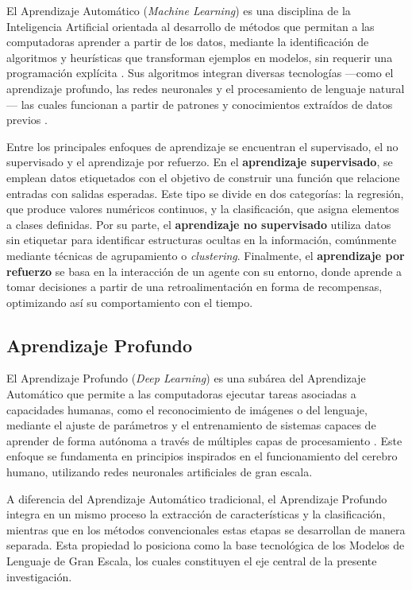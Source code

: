 \documentclass[listof=nochaptergap,12pt,times,authoryear]{report}
\begin{document}
El Aprendizaje Automático (\textit{Machine Learning}) es una disciplina de la Inteligencia Artificial orientada al desarrollo de métodos que permitan a las computadoras aprender a partir de los datos, mediante la identificación de algoritmos y heurísticas que transforman ejemplos en modelos, sin requerir una programación explícita \parencite{bk_russell2009intart}. Sus algoritmos integran diversas tecnologías —como el aprendizaje profundo, las redes neuronales y el procesamiento de lenguaje natural— las cuales funcionan a partir de patrones y conocimientos extraídos de datos previos \parencite{bk_alpaydin2014ml}.

Entre los principales enfoques de aprendizaje se encuentran el supervisado, el no supervisado y el aprendizaje por refuerzo. En el \textbf{aprendizaje supervisado}, se emplean datos etiquetados con el objetivo de construir una función que relacione entradas con salidas esperadas. Este tipo se divide en dos categorías: la regresión, que produce valores numéricos continuos, y la clasificación, que asigna elementos a clases definidas. Por su parte, el \textbf{aprendizaje no supervisado} utiliza datos sin etiquetar para identificar estructuras ocultas en la información, comúnmente mediante técnicas de agrupamiento o \textit{clustering}. Finalmente, el \textbf{aprendizaje por refuerzo} se basa en la interacción de un agente con su entorno, donde aprende a tomar decisiones a partir de una retroalimentación en forma de recompensas, optimizando así su comportamiento con el tiempo.
 
\subsection{Aprendizaje Profundo}
 
El Aprendizaje Profundo (\textit{Deep Learning}) es una subárea del Aprendizaje Automático que permite a las computadoras ejecutar tareas asociadas a capacidades humanas, como el reconocimiento de imágenes o del lenguaje, mediante el ajuste de parámetros y el entrenamiento de sistemas capaces de aprender de forma autónoma a través de múltiples capas de procesamiento \parencite{gl_sas_deeplearning}. Este enfoque se fundamenta en principios inspirados en el funcionamiento del cerebro humano, utilizando redes neuronales artificiales de gran escala.

A diferencia del Aprendizaje Automático tradicional, el Aprendizaje Profundo integra en un mismo proceso la extracción de características y la clasificación, mientras que en los métodos convencionales estas etapas se desarrollan de manera separada. Esta propiedad lo posiciona como la base tecnológica de los Modelos de Lenguaje de Gran Escala, los cuales constituyen el eje central de la presente investigación.
 
\end{document}
